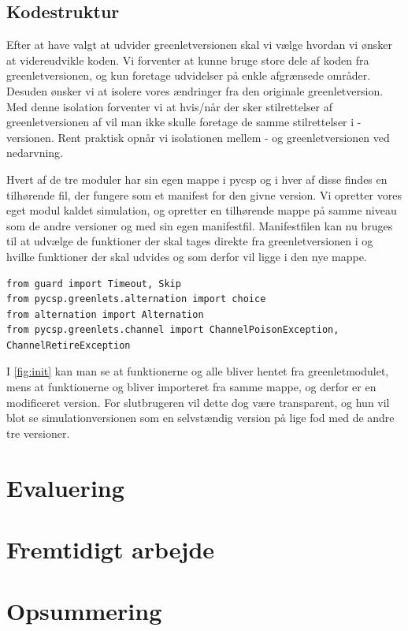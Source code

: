 \subsection{Kodestruktur}  Efter at have valgt at udvider greenletversionen skal vi vælge hvordan vi ønsker at videreudvikle koden. Vi forventer at kunne bruge store dele af koden fra greenletversionen, og kun foretage udvidelser på enkle afgrænsede områder. Desuden ønsker vi at isolere vores ændringer fra den originale greenletversion. Med denne isolation forventer vi at hvis/når der sker stilrettelser af greenletversionen af \pycsp vil man ikke skulle foretage de samme stilrettelser i \des-versionen. 
Rent praktisk opnår vi isolationen mellem \des- og greenletversionen ved nedarvning. 

Hvert af de tre moduler har sin egen mappe i pycsp og i hver af disse findes en tilhørende  fil, der fungere som et manifest for den givne version. Vi opretter vores eget modul kaldet simulation, og opretter en tilhørende mappe på samme niveau som de andre versioner og med sin egen manifestfil. Manifestfilen kan nu bruges til at udvælge de funktioner der skal tages direkte fra greenletversionen i og hvilke funktioner der skal udvides og som derfor vil ligge i den nye mappe.

\begin{lstlisting}[float=hbtp,label=fig:init,caption=Uddrag af \code{\_\_init\_\_.py} for simulationsversionen.]
from guard import Timeout, Skip
from pycsp.greenlets.alternation import choice
from alternation import Alternation
from pycsp.greenlets.channel import ChannelPoisonException, ChannelRetireException
\end{lstlisting}

I \cref{fig:init} kan man se at funktionerne  og  alle bliver hentet fra greenletmodulet, mens at funktionerne  og  bliver importeret fra samme mappe, og derfor er en modificeret version. For slutbrugeren  vil dette dog være transparent, og hun vil blot se simulationversionen som en selvstændig version på lige fod med de andre tre versioner.


 
    
  \section{Evaluering}
  \section{Fremtidigt arbejde}
  \section{Opsummering}
